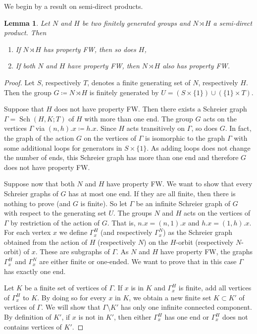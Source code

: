 \documentclass[a4paper]{article}
\newtheorem{lem}{Lemma}[section]
\theoremstyle{definition}
\theoremstyle{remark}%
\DeclareMathOperator\Sch{Sch}
\begin{document}
We begin by a result on semi-direct products.
%
%
\begin{lem}\label{Lemma:Semidirect_ends}
Let $N$ and $H$ be two finitely generated groups and $N\rtimes H$ a semi-direct product.
Then
\begin{enumerate}
\item If $N\rtimes H$ has property FW, then so does $H$,
\item If both $N$ and $H$ have property FW, then $N\rtimes H$ also has property FW.
\end{enumerate}
\end{lem}
%
%
\begin{proof}
Let $S$, respectively $T$, denotes a finite generating set of $N$, respectively $H$.
Then the group $G\coloneqq N\rtimes H$ is finitely generated by $U=(S\times\{1\}) \cup(\{1\}\times T)$.

Suppose that $H$ does not have property FW. Then there exists a Schreier graph $\Gamma=\Sch(H,K;T)$ of $H$ with more than one end. The group $G$ acts on the vertices $\Gamma$ via $(n,h).x \coloneqq h.x$.
Since $H$ acts transitively on $\Gamma$, so does $G$.
In fact, the graph of the action $G$ on the vertices of $\Gamma$ is isomorphic to the graph $\Gamma$ with some additional loops for generators in $S\times\{1\}$. As adding loops does not change the number of ends, this Schreier graph has more than one end and therefore $G$ does not have property FW.

Suppose now that both $N$ and $H$ have property FW. We want to show that every Schreier graphs of $G$ has at most one end. If they are all finite, then there is nothing to prove (and $G$ is finite). So let $\Gamma$ be an infinite Schreier graph of $G$ with respect to the generating set $U$. The groups $N$ and $H$ acts on the vertices of $\Gamma$ by restriction of the action of $G$. That is, $n.x = (n,1).x$ and $h.x = (1,h).x$.
For each vertex $x$ we define $\Gamma_x^H$ (and respectively $\Gamma_x^N$) as the Schreier graph obtained from the action of $H$ (respectively $N$) on the $H$-orbit (respectively $N$-orbit) of $x$. These are subgraphs of $\Gamma$. As $N$ and $H$ have property FW, the graphs $\Gamma_x^H$ and $\Gamma_x^N$ are either finite or one-ended. We want to prove that in this case $\Gamma$ has exactly one end. 

Let $K$ be a finite set of vertices of $\Gamma$.
If $x$ is in $K$ and $\Gamma_x^H$ is finite, add all vertices of $\Gamma_x^H$ to $K$.
By doing so for every $x$ in $K$, we obtain a new finite set $K\subset K'$ of vertices of $\Gamma$.
We will show that $\Gamma\setminus K'$ has only one infinite connected component.
By definition of $K'$, if $x$ is not in $K'$, then either $\Gamma_x^H$ has one end or $\Gamma_x^H$ does not contains vertices of $K'$. 


\end{proof}
\end{document}
